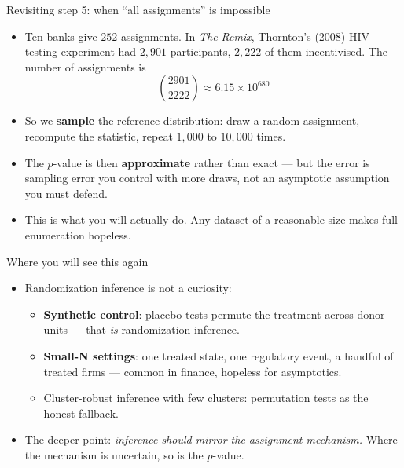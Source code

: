 \documentclass[
  11pt,
  ignorenonframetext,
  aspectratio=169,
]{beamer}
\providecommand{\tightlist}{%
  \setlength{\itemsep}{0pt}\setlength{\parskip}{0pt}}
\begin{document}
\begin{frame}{Revisiting step 5: when ``all assignments'' is impossible}
\protect{}\label{revisiting-step-5-when-all-assignments-is-impossible}
\begin{itemize}
\tightlist
\item
  Ten banks give \(252\) assignments. In \emph{The Remix}, Thornton's
  (2008) HIV-testing experiment had \(2{,}901\) participants,
  \(2{,}222\) of them incentivised. The number of assignments is \[
  \binom{2901}{2222} \approx 6.15 \times 10^{680}
  \]
\item
  So we \textbf{sample} the reference distribution: draw a random
  assignment, recompute the statistic, repeat \(1{,}000\) to
  \(10{,}000\) times.
\item
  The \(p\)-value is then \textbf{approximate} rather than exact --- but
  the error is sampling error you control with more draws, not an
  asymptotic assumption you must defend.
\item
  This is what you will actually do. Any dataset of a reasonable size
  makes full enumeration hopeless.
\end{itemize}
\end{frame}

\begin{frame}{Where you will see this again}
\protect{}\label{where-you-will-see-this-again}
\begin{itemize}
\tightlist
\item
  Randomization inference is not a curiosity:

  \begin{itemize}
  \tightlist
  \item
    \textbf{Synthetic control}: placebo tests permute the treatment
    across donor units --- that \emph{is} randomization inference.
  \item
    \textbf{Small-N settings}: one treated state, one regulatory event,
    a handful of treated firms --- common in finance, hopeless for
    asymptotics.
  \item
    Cluster-robust inference with few clusters: permutation tests as the
    honest fallback.
  \end{itemize}
\item
  The deeper point: \emph{inference should mirror the assignment
  mechanism.} Where the mechanism is uncertain, so is the \(p\)-value.
\end{itemize}
\end{frame}
\end{document}
